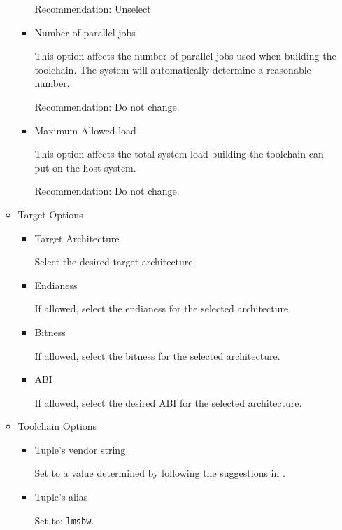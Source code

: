 \begin{enumerate}
\begin{itemize}
\begin{itemize}
        Recommendation: Unselect

      \item{Number of parallel jobs}

        This option affects the number of parallel jobs used when
        building the toolchain.  The system will automatically
        determine a reasonable number.

        Recommendation: Do not change.

      \item{Maximum Allowed load}

        This option affects the total system load building the
        toolchain can put on the host system.

        Recommendation: Do not change.

      \end{itemize}

    \item{Target Options}
      \begin{itemize}
      \item{Target Architecture}

        Select the desired target architecture.

      \item{Endianess}

        If allowed, select the endianess for the selected architecture.

      \item{Bitness}

        If allowed, select the bitness for the selected architecture.

      \item{ABI}

        If allowed, select the desired ABI for the selected architecture.

      \end{itemize}

    \item{Toolchain Options}

      \begin{itemize}
      \item{Tuple's vendor string}

        Set to a value determined by following the suggestions in
        .

        \item{Tuple's alias}

          Set to: \texttt{lmsbw}.


\end{itemize}
\end{itemize}
\end{enumerate}
